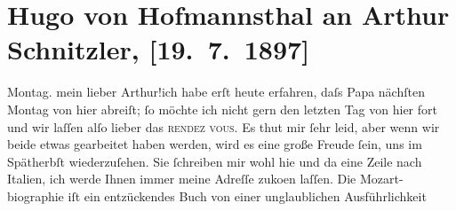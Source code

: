 

         
         \newcommand{\erwaehntePersonen}{Personen: Richard Beer-Hofmann, Hugo August von Hofmannsthal, Wolfgang Amadeus Mozart}
         \newcommand{\erwaehnteOrte}{Orte: Bad Fusch, Italien, Wien}
         \newcommand{\erwaehnteWerke}{Werke: W. A. Mozart}
               \section[Hugo von Hofmannsthal an Arthur Schnitzler, {[}19. 7. 1897{]}]{ Hugo von Hofmannsthal an Arthur Schnitzler, {[}19. 7. 1897{]}}\nopagebreak{}\rehead{ }\begin{ledgroupsized}[t]{13cm}\normalsize\beginnumbering \toendnotes[C]{\smallbreak\pagebreak[2]} 
\toendnotes[C]{\smallbreak}\pstart
           \raggedleft{}{\pb}Montag.\pend
           \pstart
           mein lieber Arthur!ich habe erſt heute erfahren, daſs Papa nächſten
                        Montag von hier abreiſt; ſo möchte ich nicht gern den letzten Tag von hier fort
                    und wir laſſen alſo lieber das \textsc{rendez vous}. Es thut
                    mir ſehr leid, aber wenn wir beide etwas gearbeitet haben werden, wird es eine
                    große Freude ſein, uns im Spätherbſt wieder{\pb}zuſehen. Sie ſchreiben mir
                    wohl hie und da eine Zeile nach Italien, ich
                    werde Ihnen immer meine Adreſſe zuko{\geminationm}en laſſen.\pend
           \pstart
           Die Mozart-biographie iſt ein entzückendes Buch von einer unglaublichen Ausführlichkeit

\end{ledgroupsized}

